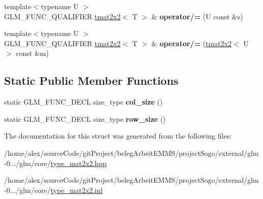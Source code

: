 \begin{DoxyCompactItemize}
\item 
\hypertarget{structglm_1_1detail_1_1tmat2x2_ae1b00b891d297f31bff39ad6cc8ac8a9}{{\footnotesize template$<$typename U $>$ }\\G\-L\-M\-\_\-\-F\-U\-N\-C\-\_\-\-Q\-U\-A\-L\-I\-F\-I\-E\-R \hyperlink{structglm_1_1detail_1_1tmat2x2}{tmat2x2}$<$ T $>$ \& {\bfseries operator/=} (U const \&s)}\label{structglm_1_1detail_1_1tmat2x2_ae1b00b891d297f31bff39ad6cc8ac8a9}

\item 
\hypertarget{structglm_1_1detail_1_1tmat2x2_aec88ffc74ce1e36a0e8cc82aee6c002a}{{\footnotesize template$<$typename U $>$ }\\G\-L\-M\-\_\-\-F\-U\-N\-C\-\_\-\-Q\-U\-A\-L\-I\-F\-I\-E\-R \hyperlink{structglm_1_1detail_1_1tmat2x2}{tmat2x2}$<$ T $>$ \& {\bfseries operator/=} (\hyperlink{structglm_1_1detail_1_1tmat2x2}{tmat2x2}$<$ U $>$ const \&m)}\label{structglm_1_1detail_1_1tmat2x2_aec88ffc74ce1e36a0e8cc82aee6c002a}

\end{DoxyCompactItemize}
\subsection*{Static Public Member Functions}
\begin{DoxyCompactItemize}
\item 
\hypertarget{structglm_1_1detail_1_1tmat2x2_a5c1a631a45f3ea10859433efd7d2c33a}{static G\-L\-M\-\_\-\-F\-U\-N\-C\-\_\-\-D\-E\-C\-L size\-\_\-type {\bfseries col\-\_\-size} ()}\label{structglm_1_1detail_1_1tmat2x2_a5c1a631a45f3ea10859433efd7d2c33a}

\item 
\hypertarget{structglm_1_1detail_1_1tmat2x2_a7b779a0e12e4e42a4372b03562ce7df9}{static G\-L\-M\-\_\-\-F\-U\-N\-C\-\_\-\-D\-E\-C\-L size\-\_\-type {\bfseries row\-\_\-size} ()}\label{structglm_1_1detail_1_1tmat2x2_a7b779a0e12e4e42a4372b03562ce7df9}

\end{DoxyCompactItemize}


The documentation for this struct was generated from the following files\-:\begin{DoxyCompactItemize}
\item 
/home/alex/source\-Code/git\-Project/beleg\-Arbeit\-E\-M\-M\-S/project\-Sogo/external/glm-\/0.../glm/core/\hyperlink{type__mat2x2_8hpp}{type\-\_\-mat2x2.\-hpp}\item 
/home/alex/source\-Code/git\-Project/beleg\-Arbeit\-E\-M\-M\-S/project\-Sogo/external/glm-\/0.../glm/core/\hyperlink{type__mat2x2_8inl}{type\-\_\-mat2x2.\-inl}\end{DoxyCompactItemize}
